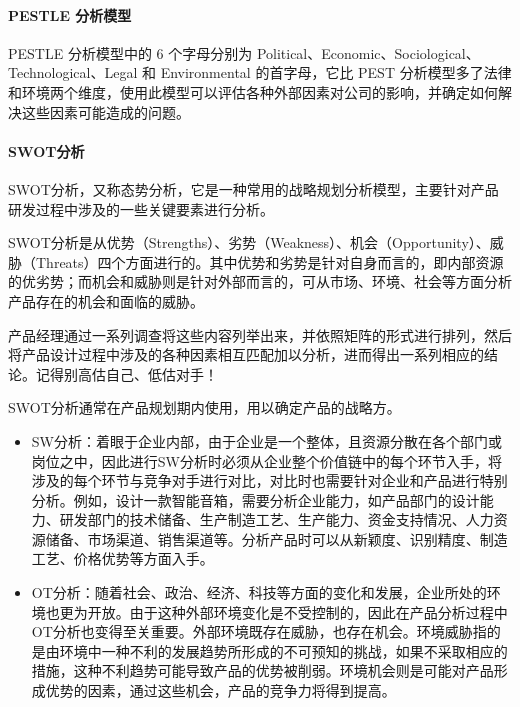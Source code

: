 \documentclass[letterpaper,11pt,english]{sphinxmanual}
\begin{document}
\paragraph{PESTLE 分析模型}
\label{\detokenize{chapter_knowledge/compete_analysis:pestle}}
PESTLE 分析模型中的 6 个字母分别为
Political、Economic、Sociological、Technological、Legal 和 Environmental
的首字母，它比 PEST
分析模型多了法律和环境两个维度，使用此模型可以评估各种外部因素对公司的影响，并确定如何解决这些因素可能造成的问题。


\paragraph{SWOT分析}
\label{\detokenize{chapter_knowledge/compete_analysis:swot}}
SWOT分析，又称态势分析，它是一种常用的战略规划分析模型，主要针对产品研发过程中涉及的一些关键要素进行分析。

SWOT分析是从优势（Strengths）、劣势（Weakness）、机会（Opportunity）、威胁（Threats）四个方面进行的。其中优势和劣势是针对自身而言的，即内部资源的优劣势；而机会和威胁则是针对外部而言的，可从市场、环境、社会等方面分析产品存在的机会和面临的威胁。

产品经理通过一系列调查将这些内容列举出来，并依照矩阵的形式进行排列，然后将产品设计过程中涉及的各种因素相互匹配加以分析，进而得出一系列相应的结论。记得别高估自己、低估对手！
%
\begin{footnote}[479]\sphinxAtStartFootnote
{}
%
\end{footnote}

SWOT分析通常在产品规划期内使用，用以确定产品的战略方。
\begin{itemize}
\item {} 
SW分析：着眼于企业内部，由于企业是一个整体，且资源分散在各个部门或岗位之中，因此进行SW分析时必须从企业整个价值链中的每个环节入手，将涉及的每个环节与竞争对手进行对比，对比时也需要针对企业和产品进行特别分析。例如，设计一款智能音箱，需要分析企业能力，如产品部门的设计能力、研发部门的技术储备、生产制造工艺、生产能力、资金支持情况、人力资源储备、市场渠道、销售渠道等。分析产品时可以从新颖度、识别精度、制造工艺、价格优势等方面入手。

\item {} 
OT分析：随着社会、政治、经济、科技等方面的变化和发展，企业所处的环境也更为开放。由于这种外部环境变化是不受控制的，因此在产品分析过程中OT分析也变得至关重要。外部环境既存在威胁，也存在机会。环境威胁指的是由环境中一种不利的发展趋势所形成的不可预知的挑战，如果不采取相应的措施，这种不利趋势可能导致产品的优势被削弱。环境机会则是可能对产品形成优势的因素，通过这些机会，产品的竞争力将得到提高。

\end{itemize}
\end{document}
